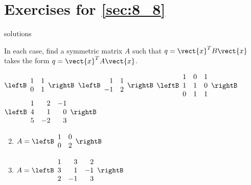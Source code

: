 
\section*{Exercises for \ref{sec:8_8}}

\begin{Filesave}{solutions}
\end{Filesave}

\begin{multicols}{2}
\begin{ex}
In each case, find a symmetric matrix $A$ such that $q = \vect{x}^{T}B\vect{x}$ takes the form $q = \vect{x}^{T}A\vect{x}$.


\begin{exenumerate}
\exitem $\leftB \begin{array}{rr}
1 & 1 \\
0 & 1
\end{array}\rightB$
\exitem $\leftB \begin{array}{rr}
1 & 1 \\
-1 & 2
\end{array}\rightB$
\exitem $\leftB \begin{array}{rrr}
1 & 0 & 1 \\
1 & 1 & 0 \\
0 & 1 & 1
\end{array}\rightB$
\exitem $\leftB \begin{array}{rrr}
1 & 2 & -1 \\
4 & 1 & 0 \\
5 & -2 & 3
\end{array}\rightB$
\end{exenumerate}
\begin{sol}
\begin{enumerate}[label={\alph*.}]
\setcounter{enumi}{1}
\item  $A = \leftB \begin{array}{rr}
1 & 0 \\
0 & 2
\end{array}\rightB$

\setcounter{enumi}{3}
\item  $A = \leftB \begin{array}{rrr}
1 & 3 & 2 \\
3 & 1 & -1 \\
2 & -1 & 3
\end{array}\rightB$

\end{enumerate}
\end{sol}
\end{ex}


\end{multicols}
